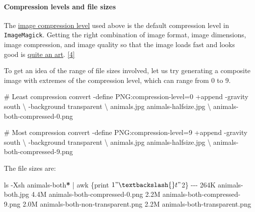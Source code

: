 \documentclass[
  12pt,
  british,
  a4paper,
  rgb,
  dvipsnames,
  svgnames,
  hyphens]{article}
\newenvironment{Shaded}{\begin{snugshade}}{\end{snugshade}}
\newcommand{\AttributeTok}[1]{\textcolor[rgb]{0.80,0.80,0.80}{#1}}
\newcommand{\CommentTok}[1]{\textcolor[rgb]{0.50,0.62,0.50}{#1}}
\newcommand{\DataTypeTok}[1]{\textcolor[rgb]{0.87,0.87,0.75}{#1}}
\newcommand{\ExtensionTok}[1]{\textcolor[rgb]{0.80,0.80,0.80}{#1}}
\newcommand{\FunctionTok}[1]{\textcolor[rgb]{0.94,0.94,0.56}{#1}}
\newcommand{\KeywordTok}[1]{\textcolor[rgb]{0.94,0.87,0.69}{#1}}
\newcommand{\NormalTok}[1]{\textcolor[rgb]{0.80,0.80,0.80}{#1}}
\newcommand{\PreprocessorTok}[1]{\textcolor[rgb]{1.00,0.81,0.69}{\textbf{#1}}}
\newcommand{\StringTok}[1]{\textcolor[rgb]{0.80,0.58,0.58}{#1}}
\begin{document}
\hypertarget{compression-levels-and-file-sizes}{%
\paragraph{Compression levels and file
sizes}\label{compression-levels-and-file-sizes}}

The \href{https://en.wikipedia.org/wiki/Image_compression}{image
compression level} used above is the default compression level in
\texttt{ImageMagick}. Getting the right combination of image format,
image dimensions, image compression, and image quality so that the image
loads fast and looks good is
\href{https://www.smashingmagazine.com/2015/06/efficient-image-resizing-with-imagemagick/}{quite
an art}. \protect\hyperlink{ref-newton2015}{{[}4{]}}

To get an idea of the range of file sizes involved, let us try
generating a composite image with extremes of the compression level,
which can range from 0 to 9.

\begin{Shaded}
\begin{Highlighting}[]
\CommentTok{\# Least compression}
\ExtensionTok{convert} \AttributeTok{{-}define}\NormalTok{ PNG:compression{-}level=0 +append }\AttributeTok{{-}gravity}\NormalTok{ south }\DataTypeTok{\textbackslash{}}
\NormalTok{{-}background transparent }\DataTypeTok{\textbackslash{}}
\NormalTok{animals.jpg animals{-}halfsize.jpg }\DataTypeTok{\textbackslash{}}
\NormalTok{animals{-}both{-}compressed{-}0.png}

\CommentTok{\# Most compression}
\ExtensionTok{convert} \AttributeTok{{-}define}\NormalTok{ PNG:compression{-}level=9 +append }\AttributeTok{{-}gravity}\NormalTok{ south }\DataTypeTok{\textbackslash{}}
\NormalTok{{-}background transparent }\DataTypeTok{\textbackslash{}}
\NormalTok{animals.jpg animals{-}halfsize.jpg }\DataTypeTok{\textbackslash{}}
\NormalTok{animals{-}both{-}compressed{-}9.png}
\end{Highlighting}
\end{Shaded}

The file sizes are:

\begin{Shaded}
\begin{Highlighting}[]
\FunctionTok{ls} \AttributeTok{{-}Xsh}\NormalTok{ animals{-}both}\PreprocessorTok{*} \KeywordTok{|} \FunctionTok{awk} \StringTok{\textquotesingle{}\{print $1 "\textbackslash{}t" $2\}\textquotesingle{}}
\ExtensionTok{{-}{-}{-}}
\ExtensionTok{264K}\NormalTok{    animals{-}both.jpg}
\ExtensionTok{4.4M}\NormalTok{    animals{-}both{-}compressed{-}0.png}
\ExtensionTok{2.2M}\NormalTok{    animals{-}both{-}compressed{-}9.png}
\ExtensionTok{2.0M}\NormalTok{    animals{-}both{-}non{-}transparent.png}
\ExtensionTok{2.2M}\NormalTok{    animals{-}both{-}transparent.png}
\end{Highlighting}
\end{Shaded}
\end{document}

